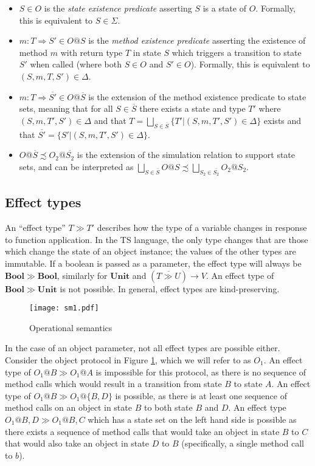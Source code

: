 \documentclass[preprint]{sigplanconf}
\newcommand{\figref}[1]{Figure \ref{#1}}
\newcommand{\unitt}{\mathbf{Unit}}
\newcommand{\boolt}{\mathbf{Bool}}
\newcommand{\funt}[3]{(\overline{#1 \gg #2}) \rightarrow #3}
\begin{document}
\begin{itemize}
\item $S \in O$ is the {\it state existence predicate} asserting 
$S$ is a state of $O$. 
Formally, this is equivalent to $S \in \Sigma$.
\item $m : T \Rightarrow S' \in O@S$ is the {\it method existence predicate} 
asserting the existence
of method $m$ with return type $T$ in state $S$ which triggers a 
transition to state $S'$ when called (where both $S \in O$ and $S' \in O$). 
Formally, this is equivalent to $(S,m,T,S') \in \Delta$.
\item $m : T \Rightarrow \overline{S'} \in O@\overline{S}$ is the extension
of the method existence predicate to state sets, meaning that for all 
$S \in \overline{S}$ there exists a state and type 
$T'$ where $(S,m,T',S') \in \Delta$ and that
$T = \bigsqcup_{S \in \overline{S}} \{ T' | (S,m,T',S') \in \Delta \}$ exists
and that $\overline{S'} = \{ S' | (S,m,T',S') \in \Delta \}$.
\item $O@\overline{S} \precsim O_2@\overline{S_2}$ is the extension of the
simulation relation to support state sets, and can be interpreted as
$\bigsqcup_{S \in \overline{S}}O@S \precsim \bigsqcup_{S_2 \in \overline{S_2}}O_2@S_2$.
\end{itemize}

\subsection{Effect types}

An ``effect type'' $T \gg T'$ describes how the type of a variable changes
in response to function application. In the TS language, the only type
changes that are those which change the state of an object instance; the
values of the other types are immutable. If a boolean is passed as a parameter,
the effect type will always be $\boolt \gg \boolt$, similarly for
$\unitt$ and $\funt{T}{U}{V}$. An effect type of $\boolt \gg \unitt$ is not
possible. In general, effect types are kind-preserving.

\begin{figure}
\texttt{[image: sm1.pdf]}
\caption{\label{fig:sm1} Operational semantics}
\end{figure}

In the case of an object parameter, not all effect types are possible
either. Consider
the object protocol in \figref{fig:sm1}, which we will refer to as $O_1$.
An effect type of $O_1@B \gg O_1@A$ is impossible for this protocol, as there
is no sequence of method calls which would result in a transition from state
$B$ to state $A$. An effect type of $O_1@B \gg O_1@\{B,D\}$ is possible, 
as there is at least one sequence of method calls on an object in
state $B$ to both state $B$ and $D$.
An effect type $O_1@{B,D} \gg O_1@{B,C}$ which has a state set on
the left hand side is possible as there exists a sequence of method calls 
that would take an object in state $B$ to $C$ that would also
take an object in state $D$ to $B$ (specifically, a single method
call to $b$).
\end{document}
